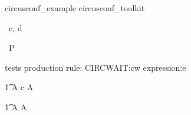 \begin{zsection}
   \SECTION circusconf\_example \parents circusconf\_toolkit
\end{zsection}

\begin{circus}
   \circchannel\ c, d \\
\end{circus}

\begin{circus}
    \circprocess\ P \circdef \circbegin \\
\end{circus}

tests production rule: CIRCWAIT:cw expression:e
\begin{circusaction}
        \t1 A \circdef \lcircconf c \then A  \rcircconf \\
\end{circusaction} 
      
\begin{circusaction}
     \t1 \circspot A \circseq A  \\
\end{circusaction}

\begin{circus}
    \circend
\end{circus}


   